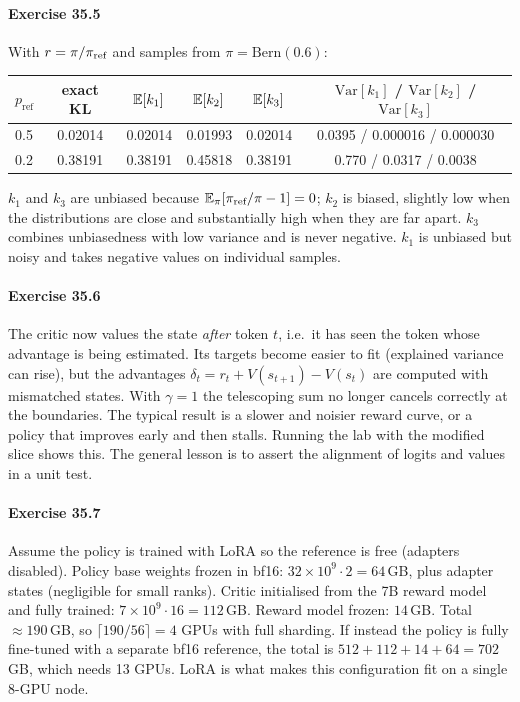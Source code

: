 \paragraph{Exercise 35.5} With $r=\pi/\pi_{\text{ref}}$ and samples from $\pi=\mathrm{Bern}(0.6)$:
\begin{center}\small
\begin{tabular}{@{}lccccc@{}}
\toprule
$p_{\text{ref}}$ & exact KL & $\mathbb{E}[k_1]$ & $\mathbb{E}[k_2]$ & $\mathbb{E}[k_3]$ & $\mathrm{Var}[k_1]$ / $\mathrm{Var}[k_2]$ / $\mathrm{Var}[k_3]$\\
\midrule
0.5 & 0.02014 & 0.02014 & 0.01993 & 0.02014 & 0.0395 / 0.000016 / 0.000030\\
0.2 & 0.38191 & 0.38191 & 0.45818 & 0.38191 & 0.770 / 0.0317 / 0.0038\\
\bottomrule
\end{tabular}
\end{center}
$k_1$ and $k_3$ are unbiased because $\mathbb{E}_\pi[\pi_{\text{ref}}/\pi-1]=0$; $k_2$ is biased, slightly low when the
distributions are close and substantially high when they are far apart. $k_3$ combines unbiasedness
with low variance and is never negative. $k_1$ is unbiased but noisy and takes negative values on
individual samples.

\paragraph{Exercise 35.6} The critic now values the state \emph{after} token $t$, i.e.\ it has seen the token whose
advantage is being estimated. Its targets become easier to fit (explained variance can rise), but the
advantages $\delta_t=r_t+V(s_{t+1})-V(s_t)$ are computed with mismatched states. With $\gamma=1$ the
telescoping sum no longer cancels correctly at the boundaries. The typical result is a slower and noisier reward
curve, or a policy that improves early and then stalls. Running the lab with the modified slice shows
this. The general lesson is to assert the alignment of logits and values in a unit test.

\paragraph{Exercise 35.7} Assume the policy is trained with LoRA so the reference is free (adapters
disabled). Policy base weights frozen in bf16: $32\times10^9\cdot2=64$\,GB, plus adapter states
(negligible for small ranks). Critic initialised from the 7B reward model and fully trained:
$7\times10^9\cdot16=112$\,GB. Reward model frozen: $14$\,GB. Total $\approx190$\,GB, so
$\lceil190/56\rceil=4$ GPUs with full sharding. If instead the policy is fully fine-tuned with a separate
bf16 reference, the total is $512+112+14+64=702$\,GB, which needs 13 GPUs. LoRA is what makes this
configuration fit on a single 8-GPU node.

